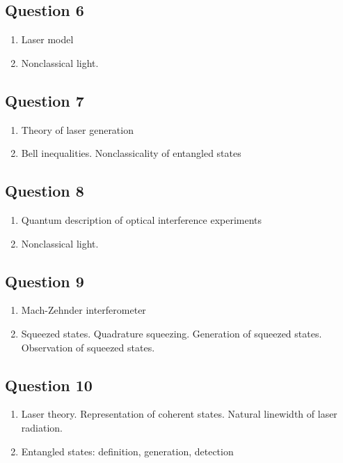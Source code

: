 \documentclass[12pt,a4paper]{article}
\begin{document}
\subsection*{Question 6} 
\begin{enumerate}
\item Laser model
\item Nonclassical light.
\end{enumerate}

\subsection*{Question 7} 
\begin{enumerate}
\item Theory of laser generation
\item Bell inequalities. Nonclassicality of entangled states
\end{enumerate}

\subsection*{Question 8} 
\begin{enumerate}
\item Quantum description of optical interference experiments
\item Nonclassical light.
\end{enumerate}

\subsection*{Question 9} 
\begin{enumerate}
\item Mach-Zehnder interferometer
\item Squeezed states. Quadrature squeezing. Generation
  of squeezed states. Observation of squeezed states.
\end{enumerate}

\subsection*{Question 10} 
\begin{enumerate}
\item Laser theory. Representation of coherent states. Natural
  linewidth of laser radiation.
\item Entangled states: definition, generation, detection
\end{enumerate}
\end{document}
